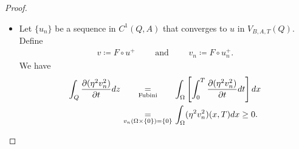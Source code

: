 \documentclass[11pt, a4paper]{article}
\numberwithin{equation}{section}
\newcommand{\coex}[2][\hphantom{longexplanation}]{%
  \underset{{#1}}{\overset{\hphantom{longexplanation}}{#2}}
}
\newcommand{\abs}[1]{\left\lvert #1\right\rvert}
\begin{document}
\begin{proof}
\begin{itemize}[wide]
Combining \eqref{pa1} and \eqref{pa1b}, we get 
\begin{align*}
\sum_{i,j=1}^{N}\frac{\partial (\eta v)}{\partial
    x_{i}}\frac{\partial(\eta v)}{\partial x_{j}}b_{ij}
  &\coex[\eqref{pa1} \text{ and } \eqref{pa1b}]{\le}
    c_{0} \left[\eta^{2}\varphi\frac{\partial u}{\partial
    t}+\sum_{i,j=1}^{N}\frac{\partial \left(\eta^{2}\varphi \right)}{\partial
    x_{i}}\frac{\partial u}{\partial x_{j}}b_{ij} \right] \\
  &\coex{~}\qquad -
    c_{0} \left[\frac{1}{2}\frac{\partial \left(\eta^{2}v^{2} \right)}{\partial t}-\eta
    v^{2}\frac{\partial\eta}{\partial t} \right]\\
  &\coex{~} \qquad -2(c_{0}-1
) v\sum_{i,j=1}^{N}\frac{\partial  (\eta v)}{\partial
    x_{i}}\frac{\partial\eta }{\partial x_{j}}b_{ij}\\
  &\coex{~} \qquad +
    (2c_{0}-1)v^{2}\sum_{i,j=1}^{N}\frac{\partial \eta}{\partial
    x_{i}}\frac{\partial \eta }{\partial x_{j}}b_{ij}\\
  &\coex[\eqref{c1},~ \text{Schwarz}]{\le}
    c_{0} \left[ \eta^{2}\varphi\frac{\partial u}{\partial
    t}+\sum_{i,j=1}^{N}\frac{\partial \left(\eta^{2}\varphi \right)}{\partial
    x_{i}}\frac{\partial u}{\partial x_{j}}b_{ij} \right]\\
  &\coex{~}\qquad -
    \frac{1}{2}c_{0}\frac{\partial \left(\eta^{2}v^{2} \right)}{\partial t}+
    c_{0}\eta v^{2}\abs{\nabla \eta}\\
  &\coex{~} \qquad +2c_{0} v \abs{\nabla_x (\eta v)} \abs{\nabla_x \eta}\overline{b}+ 3c_{0}v^{2}\abs{\nabla_x \eta}^{2}\overline{b},
\end{align*}
and we obtain $(i)$.
\item[$(ii)$] Let $\{u_{n}\}$ be a sequence in $C^{1}(Q,A)$ that
  converges to $u$ in $V_{B,A,T}(Q)$. Define 
  \begin{align*}
  v \coloneqq F \circ u^+ \qquad \text{ and } \qquad v_n \coloneqq F
    \circ u_n^+.
  \end{align*} We have
  \begin{align}
    \begin{split}
  \int_{Q}\frac{\partial (\eta^{2}v_{n}^{2})}{\partial t}dz
  &\coex[\text{Fubini}]{=}
  \int_{\Omega} \left[\int_{0}^{T}\frac{\partial
  (\eta^{2}v_{n}^{2})}{\partial t}dt \right]dx\\
  &\coex[v_{n} \left(\Omega\times\{0\} \right) =\{0\}]{=}
      \int_{\Omega}(\eta^{2}v_{n}^{2})(x,T)dx\ge 0.
    \end{split}
 \label{p102z1}
  \end{align}
  

\end{itemize}
\end{proof}
\end{document}
